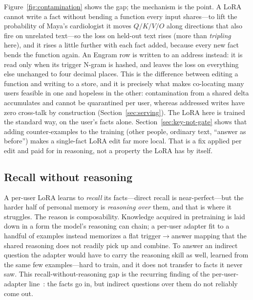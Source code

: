 \documentclass[11pt]{article}
\begin{document}
Figure~\ref{fig:contamination} shows the gap; the mechanism is the
point. A LoRA
cannot write a fact without bending a function every input
shares---to lift the probability of Maya's cardiologist it moves
$Q/K/V/O$ along directions that also fire on unrelated text---so
the loss on held-out text rises (more than \emph{tripling} here),
and it rises a little further with each fact added, because every
new fact bends the function again. An Engram row is written to an
address instead: it is read only when its trigger N-gram is
hashed, and leaves the loss on everything else unchanged to four
decimal places. This is the difference between editing a function
and writing to a store, and it is precisely what makes
co-locating many users feasible in one and hopeless in the other:
contamination from a shared delta accumulates and cannot be
quarantined per user, whereas addressed writes have zero
cross-talk by construction (Section~\ref{sec:serving}).
The LoRA here is trained the standard way, on the user's facts alone.
Section~\ref{sec:key-not-gate} shows that adding counter-examples to
the training (other people, ordinary text, ``answer as before'') makes
a single-fact LoRA edit far more local. That is a fix applied per edit
and paid for in reasoning, not a property the LoRA has by itself.

\subsection{Recall without reasoning}

A per-user LoRA learns to \emph{recall} its facts---direct recall
is near-perfect---but the harder half of personal memory is
\emph{reasoning over} them, and that is where it struggles. The
reason is composability. Knowledge acquired in pretraining is
laid down in a form the model's reasoning can chain; a per-user
adapter fit to a handful of examples instead memorizes a flat
trigger$\to$answer mapping that the shared reasoning does not
readily pick up and combine. To answer an indirect question the
adapter would have to carry the reasoning skill as well, learned
from the same few examples---hard to train, and it does not
transfer to facts it never saw. This recall-without-reasoning gap
is the recurring finding of the per-user-adapter
line~\citep{su2024prag,tan2024oppu,zhuang2024hydra}: the facts go
in, but indirect questions over them do not reliably come out.
\end{document}
